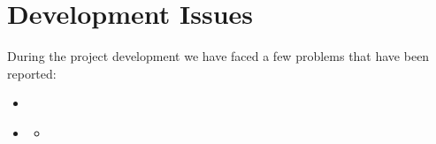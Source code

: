 \documentclass[11pt,a4paper]{article}
\begin{document}
\section{Development Issues}

During the project development we have faced a few problems that have been reported:
\begin{itemize}
    \item \href{https://github.com/IBM-Bluemix-Docs/ContinuousDelivery/issues/13}{}
    \item \href{https://github.com/IBM-Cloud/aspnet-core-helloworld/issues/39}{\color{urlColor}{github.com/IBM-Cloud/aspnet-core-helloworld/issues/39}}
    \begin{itemize}
        \item \href{https://github.com/IBM-Cloud/aspnet-core-helloworld/pull/40}{}
    \end{itemize}
\end{itemize}
\end{document}
